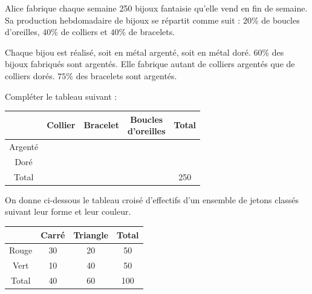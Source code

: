 \documentclass[a4paper,11pt]{article}
\begin{document}
\begin{multicols}{2}
\null\vfill

\begin{exercice}[title=Exercice 2 $\star$ { [Calculer, Représenter] }]{}{}
  Alice fabrique chaque semaine 250 bijoux fantaisie qu'elle vend en fin de semaine. Sa production hebdomadaire de bijoux se répartit comme suit : $20\%$ de boucles d'oreilles, $40\%$ de colliers et $40\%$ de bracelets.
  
  Chaque bijou est réalisé, soit en métal argenté, soit en métal doré. $60\%$ des bijoux fabriqués sont argentés.
  Elle fabrique autant de colliers argentés que de colliers dorés. $75\%$ des bracelets sont argentés.
  
  Compléter le tableau suivant :
  
  \begin{center}
  \small
  \renewcommand{\arraystretch}{1.2}
  \begin{tabular}{|c|c|c|c|c|}
  \hline
   & Collier & Bracelet & \makecell{Boucles \\d'oreilles} & Total \\ \hline
  Argenté & & & & \\ \hline
  Doré & & & & \\ \hline
  Total & & & & 250 \\ \hline
  \end{tabular}
  \end{center}
\end{exercice}

\newcolumn

\begin{exercice}[title=Exercice 3 $\star$ { [Calculer] }]{}{}
  On donne ci-dessous le tableau croisé d'effectifs d'un ensemble de jetons classés suivant leur forme et leur couleur.
  
  \begin{center}
  \small
  \renewcommand{\arraystretch}{1.2}
  \begin{tabular}{|c|c|c|c|}
  \hline
   & Carré & Triangle & Total \\ \hline
  Rouge & 30 & 20 & 50 \\ \hline
  Vert & 10 & 40 & 50 \\ \hline
  Total & 40 & 60 & 100 \\ \hline
  \end{tabular}
  \end{center}
  

\end{exercice}
\end{multicols}
\end{document}
